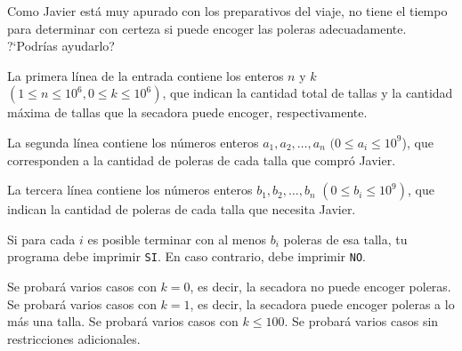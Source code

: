 \documentclass{oci}
\begin{document}
\begin{problemDescription}
Como Javier está muy apurado con los preparativos del viaje, no tiene el tiempo para determinar
con certeza si puede encoger las poleras adecuadamente.
?`Podrías ayudarlo?
\end{problemDescription}

\begin{inputDescription}
La primera línea de la entrada contiene los enteros $n$ y $k$ $(1 \leq n \leq 10^6, 0 \leq k \leq 10^6)$,
que indican la cantidad total de tallas y la cantidad máxima de tallas que la secadora puede encoger,
respectivamente.

La segunda línea contiene los números enteros $a_1, a_2, \dots, a_n$ $(0 \leq a_i \leq 10^9$),
que corresponden a la cantidad de poleras de cada talla que compró Javier.

La tercera línea contiene los números enteros $b_1, b_2, \dots, b_n$ $(0 \leq b_i \leq 10^9)$, que indican
la cantidad de poleras de cada talla que necesita Javier.
\end{inputDescription}

\begin{outputDescription}
Si para cada $i$ es posible terminar con al menos $b_i$
poleras de esa talla, tu programa debe imprimir \texttt{SI}.
En caso contrario, debe imprimir \texttt{NO}.
\end{outputDescription}

\begin{scoreDescription}
  Se probará varios casos con $k=0$, es decir, la secadora no puede encoger poleras.
  Se probará varios casos con $k=1$, es decir, la secadora puede encoger poleras a lo más una talla.
  Se probará varios casos con $k \leq 100$.
  Se probará varios casos sin restricciones adicionales.
\end{scoreDescription}
\end{document}
